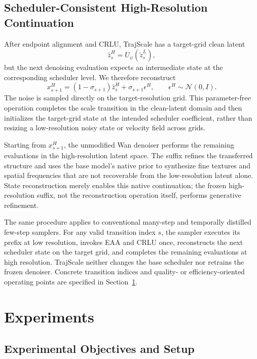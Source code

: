 \subsection{Scheduler-Consistent High-Resolution Continuation}
\label{sec:hr_continuation}

After endpoint alignment and CRLU, TrajScale has a target-grid clean latent
\[
\widehat z_s^H=U_\psi(\widetilde z_s^L),
\]
but the next denoising evaluation expects an intermediate state at the
corresponding scheduler level. We therefore reconstruct
\[
x_{s+1}^H
=(1-\sigma_{s+1})\widehat z_s^H
+\sigma_{s+1}\epsilon^H,
\qquad
\epsilon^H\sim\mathcal N(0,I).
\]
The noise is sampled directly on the target-resolution grid. This
parameter-free operation completes the scale transition in the clean-latent
domain and then initializes the target-grid state at the intended scheduler
coefficient, rather than resizing a low-resolution noisy state or velocity
field across grids.

Starting from \(x_{s+1}^H\), the unmodified Wan denoiser performs the remaining
evaluations in the high-resolution latent space. The suffix refines the
transferred structure and uses the base model's native prior to synthesize fine
textures and spatial frequencies that are not recoverable from the
low-resolution latent alone. State reconstruction merely enables this native
continuation; the frozen high-resolution suffix, not the reconstruction
operation itself, performs generative refinement.

The same procedure applies to conventional many-step and temporally distilled
few-step samplers. For any valid transition index \(s\), the sampler executes
its prefix at low resolution, invokes EAA and CRLU once, reconstructs the next
scheduler state on the target grid, and completes the remaining evaluations at
high resolution. TrajScale neither changes the base scheduler nor retrains the
frozen denoiser. Concrete transition indices and quality- or
efficiency-oriented operating points are specified in
Section~\ref{sec:experiments}.

\section{Experiments}
\label{sec:experiments}

\subsection{Experimental Objectives and Setup}

